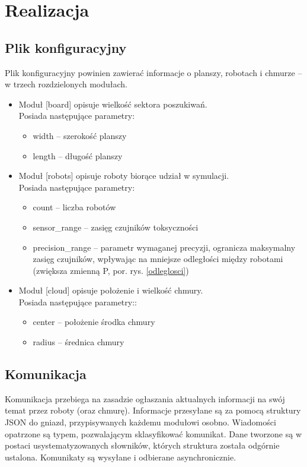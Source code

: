 \documentclass[a4paper, 12pt]{article}
\begin{document}
	
	
	\section{Realizacja}
	\subsection{Plik konfiguracyjny}
	Plik konfiguracyjny powinien zawierać informacje o planszy, robotach i chmurze -- w trzech rozdzielonych modułach.
	\begin{itemize}
	\item Moduł [board] opisuje wielkość sektora poszukiwań.\\
		Posiada następujące parametry:
	\begin{itemize}
	\item width -- szerokość planszy
	\item length -- długość planszy
	\end{itemize}
	\item Moduł [robots] opisuje roboty biorące udział w symulacji.\\
		Posiada następujące parametry:
	\begin{itemize}
	\item count -- liczba robotów
	\item sensor\_range -- zasięg czujników toksyczności
	\item precision\_range -- parametr wymaganej precyzji, ogranicza maksymalny zasięg czujników, wpływając na mniejsze odległości między robotami (zwiększa zmienną P, por. rys. \ref{odleglosci})
	\end{itemize}
	\item Moduł [cloud] opisuje położenie i wielkość chmury.\\
		Posiada następujące parametry::
	\begin{itemize}
	\item center -- położenie środka chmury
	\item radius -- średnica chmury
	\end{itemize}
	\end{itemize}
	
	\subsection{Komunikacja}
	Komunikacja przebiega na zasadzie ogłaszania aktualnych informacji na swój temat przez roboty (oraz chmurę). Informacje przesyłane są za pomocą struktury JSON do gniazd, przypisywanych każdemu modułowi osobno.
	Wiadomości opatrzone są typem, pozwalającym sklasyfikować komunikat. Dane tworzone są w postaci usystematyzowanych słowników, których struktura została odgórnie ustalona.
	Komunikaty są wysyłane i odbierane asynchronicznie.
\end{document}
